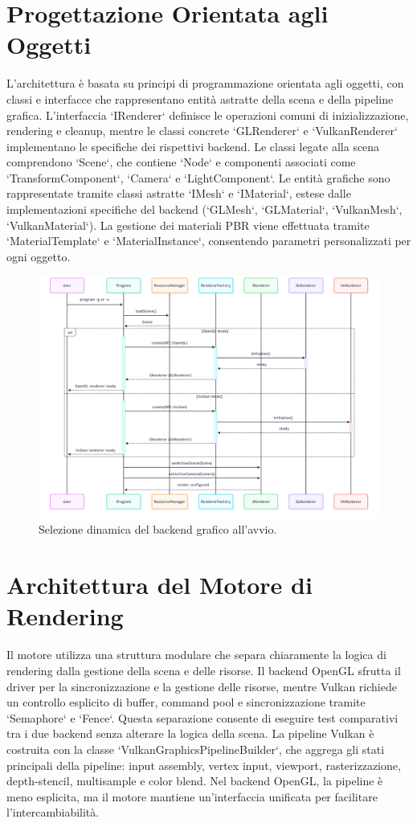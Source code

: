 \documentclass[12pt,a4paper,openright,twoside]{book}
\begin{document}
\section{Progettazione Orientata agli Oggetti}
L'architettura è basata su principi di programmazione orientata agli oggetti, con classi e interfacce che rappresentano
entità astratte della scena e della pipeline grafica. L'interfaccia `IRenderer` definisce le operazioni comuni di
inizializzazione, rendering e cleanup, mentre le classi concrete `GLRenderer` e `VulkanRenderer` implementano le
specifiche dei rispettivi backend.
Le classi legate alla scena comprendono `Scene`, che contiene `Node` e componenti associati come `TransformComponent`,
`Camera` e `LightComponent`. Le entità grafiche sono rappresentate tramite classi astratte `IMesh` e `IMaterial`, estese
dalle implementazioni specifiche del backend (`GLMesh`, `GLMaterial`, `VulkanMesh`, `VulkanMaterial`). La gestione dei
materiali PBR viene effettuata tramite `MaterialTemplate` e `MaterialInstance`, consentendo parametri personalizzati
per ogni oggetto.
\begin{figure}[H]
    \centering
    \includegraphics[width=.8\linewidth]{figures/uml_activity_dynamic_backend.png}
    \caption{Selezione dinamica del backend grafico all'avvio.}
    \label{fig:uml-activity-dynamic-backend}
\end{figure}

\section{Architettura del Motore di Rendering}
Il motore utilizza una struttura modulare che separa chiaramente la logica di rendering dalla gestione della scena e
delle risorse. Il backend OpenGL sfrutta il driver per la sincronizzazione e la gestione delle risorse, mentre Vulkan
richiede un controllo esplicito di buffer, command pool e sincronizzazione tramite `Semaphore` e `Fence`. Questa
separazione consente di eseguire test comparativi tra i due backend senza alterare la logica della scena.
La pipeline Vulkan è costruita con la classe `VulkanGraphicsPipelineBuilder`, che aggrega gli stati principali della
pipeline: input assembly, vertex input, viewport, rasterizzazione, depth-stencil, multisample e color blend. Nel backend
OpenGL, la pipeline è meno esplicita, ma il motore mantiene un'interfaccia unificata per facilitare l'intercambiabilità.
\end{document}
